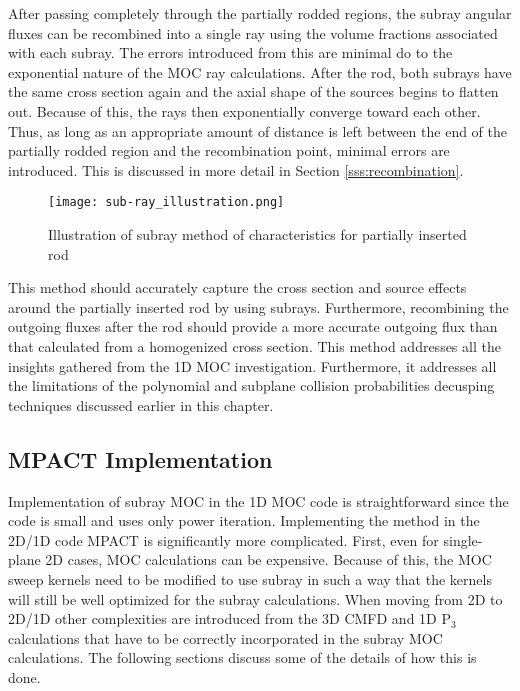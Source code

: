 After passing completely through the partially rodded regions, the subray angular fluxes can be recombined into a single ray using the volume fractions associated with each subray.  The errors introduced from this are minimal do to the exponential nature of the MOC ray calculations.  After the rod, both subrays have the same cross section again and the axial shape of the sources begins to flatten out.  Because of this, the rays then exponentially converge toward each other.  Thus, as long as an appropriate amount of distance is left between the end of the partially rodded region and the recombination point, minimal errors are introduced.  This is discussed in more detail in Section \ref{sss:recombination}.

\begin{figure}
    \centering
    \texttt{[image: sub-ray\_illustration.png]}
    \caption[Subray MOC Illustration]{Illustration of subray method of characteristics for partially inserted rod}\label{f:subrayMOC}
\end{figure}

This method should accurately capture the cross section and source effects around the partially inserted rod by using subrays.  Furthermore, recombining the outgoing fluxes after the rod should provide a more accurate outgoing flux than that calculated from a homogenized cross section.  This method addresses all the insights gathered from the 1D MOC investigation.  Furthermore, it addresses all the limitations of the polynomial and subplane collision probabilities decusping techniques discussed earlier in this chapter.

\subsection{MPACT Implementation}

Implementation of subray MOC in the 1D MOC code is straightforward since the code is small and uses only power iteration.  Implementing the method in the 2D/1D code MPACT is significantly more complicated.  First, even for single-plane 2D cases, MOC calculations can be expensive.  Because of this, the MOC sweep kernels need to be modified to use subray in such a way that the kernels will still be well optimized for the subray calculations.  When moving from 2D to 2D/1D other complexities are introduced from the 3D CMFD and 1D P$_3$ calculations that have to be correctly incorporated in the subray MOC calculations.  The following sections discuss some of the details of how this is done.

